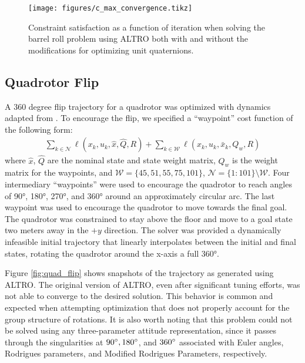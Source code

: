 \documentclass[letterpaper, 10 pt, conference]{ieeeconf}  %
\begin{document}
        \begin{figure}[t]
            \centering
            \texttt{[image: figures/c\_max\_convergence.tikz]}
            \caption{Constraint satisfaction as a function of iteration when solving the barrel roll problem using ALTRO both with and without the modifications for optimizing unit quaternions.}
            \label{fig:c_max_convergence}
        \end{figure}

    \subsection{Quadrotor Flip}
        A 360 degree flip trajectory for a quadrotor was optimized with dynamics adapted
        from \cite{mellinger2012trajectory}. To encourage the flip, we specified a 
        ``waypoint'' cost function of the following form:
        \begin{multline}
                  \sum_{k \in \mathcal{N}} \ell(x_k, u_k, \hat{x}, \hat{Q}, R) 
                + \sum_{k \in \mathcal{W}} \ell(x_k, u_k, \bar{x}_k, Q_w, R) 
        \end{multline}
        where $\hat{x}$, $\hat{Q}$ are the nominal state and state weight matrix, $Q_w$ is 
        the weight matrix for the waypoints, and
        $\mathcal{W} = \{45,51,55,75,101\}$, $\mathcal{N} = \{1:101\} \setminus
        \mathcal{W}$.
        Four intermediary ``waypoints'' were used to encourage the
        quadrotor to reach angles of \ang{90}, \ang{180}, \ang{270}, and \ang{360} around
        an approximately circular arc. The last waypoint was used to encourage the
        quadrotor to move towards the final goal. The quadrotor was constrained to stay
        above the floor and move to a goal state two meters away in the $+y$ direction. The
        solver was provided a dynamically infeasible initial trajectory that linearly
        interpolates between the initial and final states, rotating the quadrotor around
        the x-axis a full \ang{360}.

	    Figure \ref{fig:quad_flip} shows snapshots of the trajectory as generated using
	    ALTRO. The original version of ALTRO, even after significant tuning efforts, was
        not able to converge to the desired solution. 
	    This behavior is common and expected when attempting optimization that does not
	    properly account for the group structure of rotations. It is also worth noting
	    that this problem could not be solved using any three-parameter attitude
	    representation, since it passes through the singularities at $90\degree,
	    180\degree$, and $360\degree$ associated with Euler angles, Rodrigues parameters,
	    and Modified Rodrigues Parameters, respectively.
\end{document}
